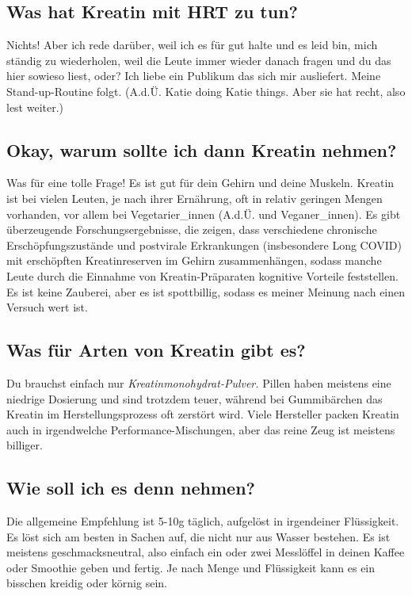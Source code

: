 \documentclass{article}
\begin{document}
\subsection{Was hat Kreatin mit HRT zu tun?}

Nichts! Aber ich rede darüber, weil ich es für gut halte und es leid bin, mich ständig zu wiederholen, weil die Leute immer wieder danach fragen und du das hier sowieso liest, oder? Ich liebe ein Publikum das sich mir ausliefert. Meine Stand-up-Routine folgt. (A.d.Ü. Katie doing Katie things. Aber sie hat recht, also lest weiter.)

\subsection{Okay, warum sollte ich dann Kreatin nehmen?}

Was für eine tolle Frage! Es ist gut für dein Gehirn und deine Muskeln. Kreatin ist bei vielen Leuten, je nach ihrer Ernährung, oft in relativ geringen Mengen vorhanden, vor allem bei Vegetarier\_innen (A.d.Ü. und Veganer\_innen). Es gibt überzeugende Forschungsergebnisse, die zeigen, dass verschiedene chronische Erschöpfungszustände und postvirale Erkrankungen (insbesondere Long COVID) mit erschöpften Kreatinreserven im Gehirn zusammenhängen, sodass manche Leute durch die Einnahme von Kreatin-Präparaten kognitive Vorteile feststellen. Es ist keine Zauberei, aber es ist spottbillig, sodass es meiner Meinung nach einen Versuch wert ist.

\subsection{Was für Arten von Kreatin gibt es?}

Du brauchst einfach nur \textit{Kreatinmonohydrat-Pulver.} Pillen haben meistens eine niedrige Dosierung und sind trotzdem teuer, während bei Gummibärchen das Kreatin im Herstellungsprozess oft zerstört wird. Viele Hersteller packen Kreatin auch in irgendwelche Performance-Mischungen, aber das reine Zeug ist meistens billiger.

\subsection{Wie soll ich es denn nehmen?}

Die allgemeine Empfehlung ist 5-10g täglich, aufgelöst in irgendeiner Flüssigkeit. Es löst sich am besten in Sachen auf, die nicht nur aus Wasser bestehen. Es ist meistens geschmacksneutral, also einfach ein oder zwei Messlöffel in deinen Kaffee oder Smoothie geben und fertig. Je nach Menge und Flüssigkeit kann es ein bisschen kreidig oder körnig sein.
\end{document}
